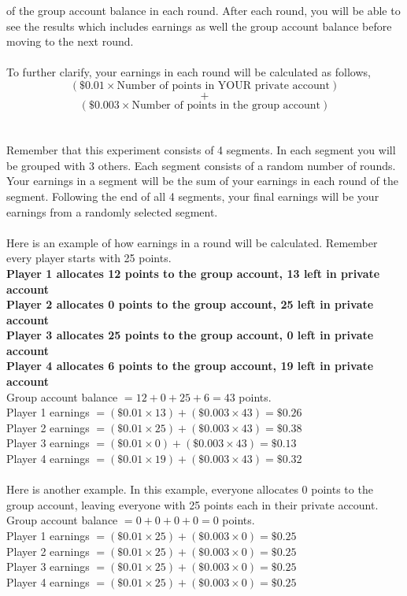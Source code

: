 \documentclass[11pt]{article}
\begin{document}
   of the group account balance in each round. After each round, you will be able to see the results which includes earnings as well the group account balance before moving to the next round.
\\\\
    To further clarify, your earnings in each round will be calculated as follows,$$(\$0.01 \times \text{Number of points in YOUR private account})$$ $$+$$ $$(\$0.003 \times \text{Number of points in the group account})$$
\\\\
    Remember that this experiment consists of 4 segments. In each segment you will be grouped with 3 others. Each segment consists of a random number of rounds. Your earnings in a segment will be the sum of your earnings in each round of the segment. Following the end of all 4 segments, your final earnings will be your earnings from a randomly selected segment.
\\\\
    Here is an example of how earnings in a round will be calculated. Remember every player starts with 25 points.\\
    \textbf{Player 1 allocates 12 points to the group account, 13 left in private account}\\
    \textbf{Player 2 allocates 0 points to the group account, 25 left in private account}\\
    \textbf{Player 3 allocates 25 points to the group account, 0 left in private account}\\
    \textbf{Player 4 allocates 6 points to the group account, 19 left in private account}\\

    \noindent Group account balance $= 12+0+25+6=43$ points.\\
    Player 1 earnings $= (\$0.01\times13)+(\$0.003\times43) = \$0.26$\\
    Player 2 earnings $= (\$0.01\times25)+(\$0.003\times43) = \$0.38$\\
    Player 3 earnings $= (\$0.01\times0)+(\$0.003\times43) = \$0.13$\\
    Player 4 earnings $= (\$0.01\times19)+(\$0.003\times43) = \$0.32$\\\\

    \noindent Here is another example. In this example, everyone allocates $0$ points to the group account, leaving everyone with 25 points each in their private account.\\
    \noindent Group account balance $= 0+0+0+0=0$ points.\\
    Player 1 earnings $= (\$0.01\times25)+(\$0.003\times0) = \$0.25$\\
    Player 2 earnings $= (\$0.01\times25)+(\$0.003\times0) = \$0.25$\\
    Player 3 earnings $= (\$0.01\times25)+(\$0.003\times0) = \$0.25$\\
    Player 4 earnings $= (\$0.01\times25)+(\$0.003\times0) = \$0.25$\\\\
\end{document}
